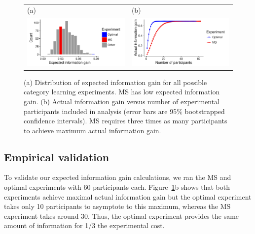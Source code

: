 \documentclass{article}
\begin{document}
\begin{figure}[t]
\centering
\begin{tabular}{l l}
(a) & (b)\\
\includegraphics[width=2.5in]{img/category-eig-dist.pdf} & \includegraphics[width=2.5in]{img/category-aig-curve.pdf}\\
\end{tabular}
\caption{(a) Distribution of expected information gain for all possible category learning experiments. MS has low expected information gain. (b) Actual information gain versus number of experimental participants included in analysis (error bars are 95\% bootstrapped confidence intervals). MS requires three times as many participants to achieve maximum actual information gain.}
\label{fig:dist}
\end{figure}

\subsection{Empirical validation}

To validate our expected information gain calculations, we ran the MS and optimal experiments with 60 participants each.
Figure~\ref{fig:dist}b shows that both experiments achieve maximal actual information gain but the optimal experiment takes only 10 participants to asymptote to this maximum, whereas the MS experiment takes around 30.
Thus, the optimal experiment provides the same amount of information for 1/3 the experimental cost.

\end{document}
